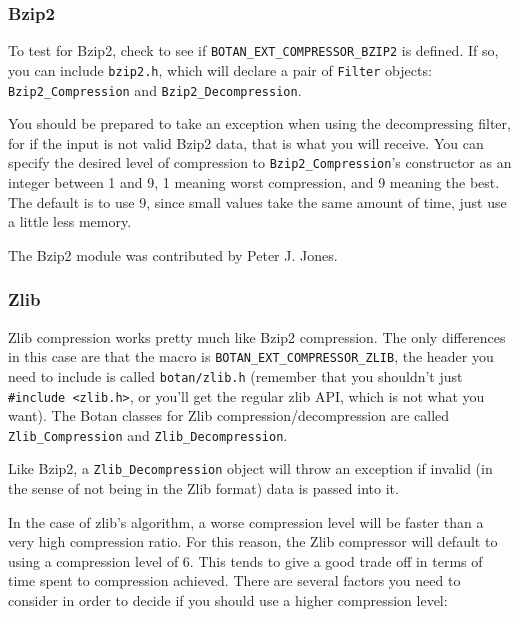 \documentclass{article}
\newcommand{\filename}[1]{\texttt{#1}}
\newcommand{\macro}[1]{\texttt{#1}}
\newcommand{\type}[1]{\texttt{#1}}
\begin{document}
\subsubsection{Bzip2}

To test for Bzip2, check to see if \macro{BOTAN\_EXT\_COMPRESSOR\_BZIP2} is
defined. If so, you can include \filename{bzip2.h}, which will declare a pair
of \type{Filter} objects: \type{Bzip2\_Compression} and
\type{Bzip2\_Decompression}.

You should be prepared to take an exception when using the decompressing
filter, for if the input is not valid Bzip2 data, that is what you will
receive. You can specify the desired level of compression to
\type{Bzip2\_Compression}'s constructor as an integer between 1 and 9, 1
meaning worst compression, and 9 meaning the best. The default is to use 9,
since small values take the same amount of time, just use a little less memory.

The Bzip2 module was contributed by Peter J. Jones.

\subsubsection{Zlib}

Zlib compression works pretty much like Bzip2 compression. The only differences
in this case are that the macro is \macro{BOTAN\_EXT\_COMPRESSOR\_ZLIB}, the
header you need to include is called \filename{botan/zlib.h} (remember that you
shouldn't just \verb|#include <zlib.h>|, or you'll get the regular zlib API,
which is not what you want). The Botan classes for Zlib
compression/decompression are called \type{Zlib\_Compression} and
\type{Zlib\_Decompression}.

Like Bzip2, a \type{Zlib\_Decompression} object will throw an exception if
invalid (in the sense of not being in the Zlib format) data is passed into it.

In the case of zlib's algorithm, a worse compression level will be faster than
a very high compression ratio. For this reason, the Zlib compressor will
default to using a compression level of 6. This tends to give a good trade off
in terms of time spent to compression achieved. There are several factors you
need to consider in order to decide if you should use a higher compression
level:
\end{document}
